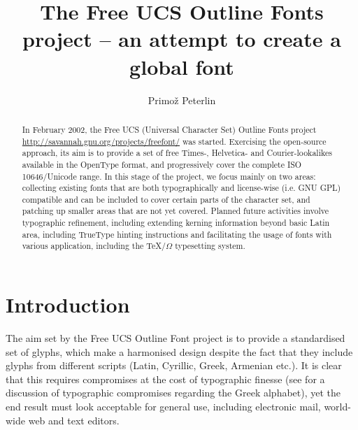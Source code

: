 \documentclass[english]{eurotex2003}
\begin{document}
\frenchspacing

\title{The Free UCS Outline Fonts project -- an attempt to create a global
font}
\author{Primo\v{z} Peterlin}
\address{University of Ljubljana\\
Faculty of Medicine, Institute of biophysics\\
Lipi\v{c}eva 2, SI-1000 Ljubljana, Slovenia}

\begin{abstract}
In February 2002, the Free UCS (Universal Character Set) Outline Fonts
project \url{http://savannah.gnu.org/projects/freefont/} was
started. Exercising the open-source approach, its aim is to provide a
set of free Times-, Helvetica- and Courier-lookalikes available in the
OpenType format, and progressively cover the complete ISO
10646/Unicode range. In this stage of the project, we focus mainly on
two areas: collecting existing fonts that are both typographically and
license-wise (i.e. GNU GPL) compatible and can be included to cover
certain parts of the character set, and patching up smaller areas that
are not yet covered. Planned future activities involve typographic
refinement, including extending kerning information beyond basic Latin
area, including TrueType hinting instructions and facilitating the
usage of fonts with various application, including the \TeX/$\Omega$
typesetting system.
\end{abstract}

\maketitle

\section{Introduction}

The aim set by the Free UCS Outline Font project is to provide a
standardised set of glyphs, which make a harmonised design despite the
fact that they include glyphs from different scripts (Latin, Cyrillic,
Greek, Armenian etc.). It is clear that this requires compromises at
the cost of typographic finesse (see
\cite{Haralambous:UnicodeTypography} for a discussion of typographic
compromises regarding the Greek alphabet), yet the end result must
look acceptable for general use, including electronic mail, world-wide
web and text editors.
\end{document}
